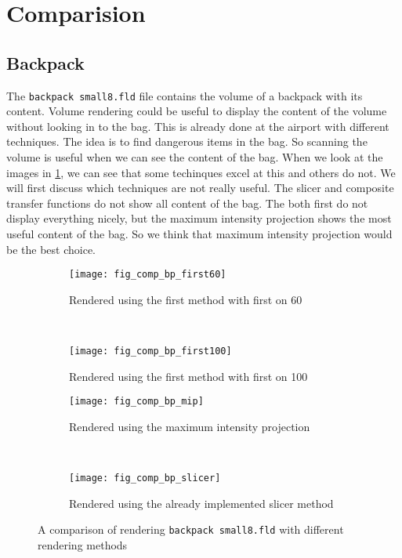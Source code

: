\section{Comparision}\label{Sec:Com}
\subsection{Backpack}
The \texttt{backpack small8.fld} file contains the volume of a backpack with its content. 
Volume rendering could be useful to display the content of the volume without looking in to the bag.
This is already done at the airport with different techniques.
The idea is to find dangerous items in the bag. 
So scanning the volume is useful when we can see the content of the bag. 
When we look at the images in \ref{fig:comp:bp}, we can see that some techinques excel at this and others do not. 
We will first discuss which techniques are not really useful. 
The slicer and composite transfer functions do not show all content of the bag.
The both first do not display everything nicely, but the maximum intensity projection shows the  most useful content of the bag. 
So we think that maximum intensity projection would be the best choice.
\begin{figure}[H]
	\centering
	\begin{subfigure}[t]{0.45\textwidth}
		\texttt{[image: fig\_comp\_bp\_first60]}
		\caption{Rendered using the first method with first on 60}
	\end{subfigure}
	~%
	\begin{subfigure}[t]{0.45\textwidth}
		\texttt{[image: fig\_comp\_bp\_first100]}
		\caption{Rendered using the first method with first on 100}
	\end{subfigure}
	
	\begin{subfigure}[t]{0.45\textwidth}
		\texttt{[image: fig\_comp\_bp\_mip]}
		\caption{Rendered using the maximum intensity projection}
	\end{subfigure}
	~%
	\begin{subfigure}[t]{0.45\textwidth}
		\texttt{[image: fig\_comp\_bp\_slicer]}
		\caption{Rendered using the already implemented slicer method}
	\end{subfigure}
	\caption{A comparison of rendering \texttt{backpack small8.fld} with different rendering methods}
	\label{fig:comp:bp}
\end{figure}
	
